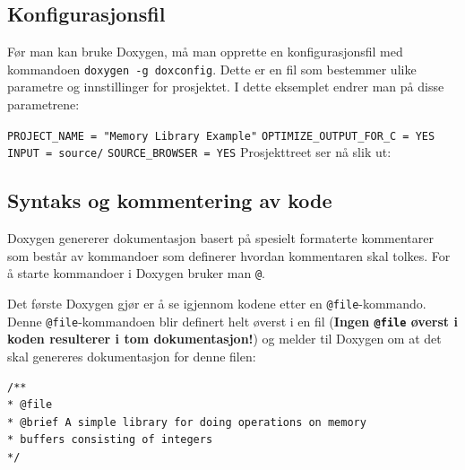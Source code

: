 \begin{alphasection}
\subsection{Konfigurasjonsfil}  

Før man kan bruke Doxygen, må man opprette en konfigurasjonsfil med kommandoen \verb|doxygen -g doxconfig|. Dette er en fil som bestemmer ulike parametre og innstillinger for prosjektet. I dette eksemplet endrer man på disse parametrene:

\verb|PROJECT_NAME = "Memory Library Example"|\newline
\verb|OPTIMIZE_OUTPUT_FOR_C = YES|\newline
\verb|INPUT = source/|\newline
\verb|SOURCE_BROWSER = YES|
\newpage
Prosjekttreet ser nå slik ut:


\subsection{Syntaks og kommentering av kode}  

Doxygen genererer dokumentasjon basert på spesielt formaterte kommentarer som består av kommandoer som definerer hvordan kommentaren skal tolkes. For å starte kommandoer i Doxygen bruker man \verb|@|.

Det første Doxygen gjør er å se igjennom kodene etter en \verb|@file|-kommando. Denne \verb|@file|-kommandoen blir definert helt øverst i en fil (\textcolor{RWTHrot100}{\textbf{Ingen \texttt{@file} øverst i koden resulterer i tom dokumentasjon!}}) og melder til Doxygen om at det skal genereres dokumentasjon for denne filen:

\begin{lstlisting}
/**
* @file
* @brief A simple library for doing operations on memory
* buffers consisting of integers
*/
\end{lstlisting}







\end{alphasection}
